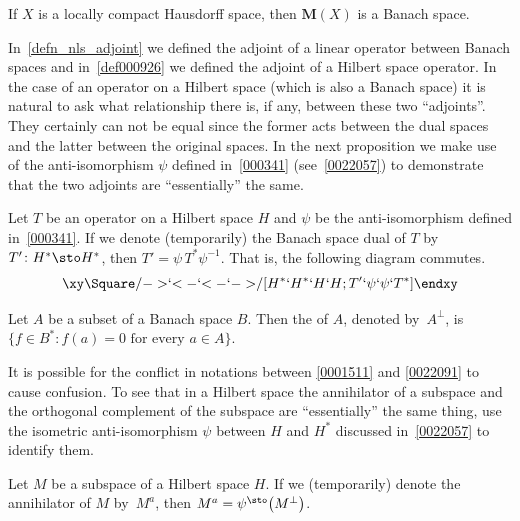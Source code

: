 \begin{cor} If $X$ is a locally compact Hausdorff space, then $\textbf{M}(X)$
is a Banach space.
\end{cor}










In~\ref{defn_nls_adjoint} we defined the adjoint of a linear operator between Banach
spaces and in~\ref{def000926} we defined the adjoint of a Hilbert space
operator. In the case of an operator on a Hilbert space (which is also a Banach space)
it is natural to ask what relationship there is, if any, between these two ``adjoints''.
They certainly can not be equal since the former acts between the dual spaces and the latter
between the original spaces.  In the next proposition we make use of the anti-isomorphism
$\psi$ defined in~\ref{000341} (see~\ref{0022057}) to demonstrate that the two adjoints are
``essentially'' the same.

\begin{prop} Let $T$ be an operator on a Hilbert space $H$ and $\psi$ be the
anti-isomorphism defined in~\ref{000341}.  If we denote (temporarily) the Banach space
dual of $T$ by $T'\colon H^* \sto H^*$, then $T' = \psi\, T^* \psi^{-1}$.  That is, the
following diagram commutes.
   \[ \xy
          \Square/{->}`{<-}`{<-}`{->}/[H^*`H^*`H`H;T'`\psi`\psi`T^*]
      \endxy \]
\end{prop}

\begin{defn}\label{0022091} Let $A$ be a subset of a Banach space $B$.  Then the
 of $A$, denoted
by~$A^\perp$, is $\{f \in B^*\colon f(a) = 0 \text{ for every $a \in A$}\}$.
\end{defn}

It is possible for the conflict in notations between \ref{0001511} and \ref{0022091} to
cause confusion. To see that in a Hilbert space the annihilator of a subspace and the
orthogonal complement of the subspace are ``essentially'' the same thing, use the
isometric anti-isomorphism $\psi$ between $H$ and $H^*$ discussed in~\ref{0022057} to identify them.

\begin{prop} Let $M$ be a subspace of a Hilbert space $H$. If we (temporarily) denote the
annihilator of $M$ by~$M^a$, then $M^a = \psi^{\sto}\bigl(M^\perp\bigr)$.
\end{prop}
















